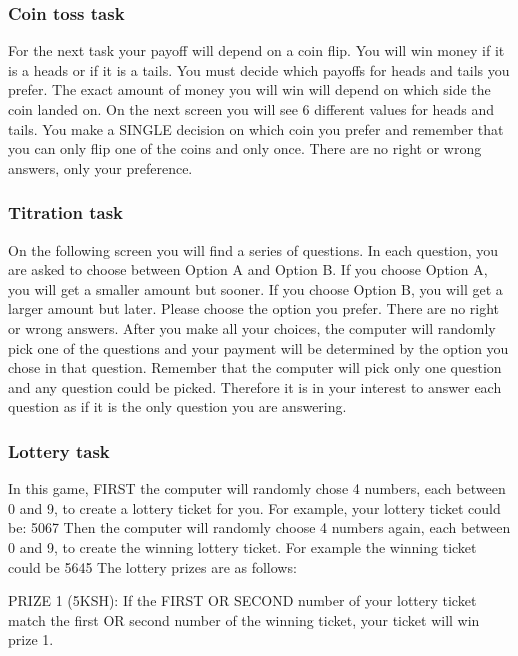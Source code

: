 \documentclass[11pt]{article}
\begin{document}
        \subsubsection{Coin toss task}

            For the next task your payoff will depend on a coin flip.  You will win money if it is a heads or if it is a tails.  You must decide which payoffs for heads and tails you prefer. The exact amount of money you will win will depend on which side the coin landed on. On the next screen you will see 6 different values for heads and tails. You make a SINGLE decision on which coin you prefer and remember that you can only flip one of the coins and only once. There are no right or wrong answers, only your preference.

        \subsubsection{Titration task}

            On the following screen you will find a series of questions. In each question, you are asked to choose between Option A and Option B. If you choose Option A, you will get a smaller amount but sooner. If you choose Option B, you will get a larger amount but later. Please choose the option you prefer. There are no right or wrong answers. After you make all your choices, the computer will randomly pick one of the questions and your payment will be determined by the option you chose in that question. Remember that the computer will pick only one question and any question could be picked. Therefore it is in your interest to answer each question as if it is the only question you are answering.

        \subsubsection{Lottery task}

            In this game, FIRST the computer will randomly chose 4 numbers, each between 0 and 9, to create a lottery ticket for you. For example, your lottery ticket could be: 5067 Then the computer will randomly choose 4 numbers again, each between 0 and 9, to create the winning lottery ticket. For example the winning ticket could be 5645 The lottery prizes are as follows:

            PRIZE 1 (5KSH): If the FIRST OR SECOND number of your lottery ticket match the first OR second number of the winning ticket, your ticket will win prize 1.
\end{document}
